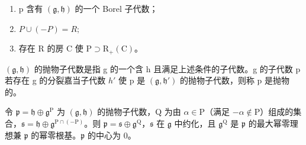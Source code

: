 \begin{enumerate}
\def\labelenumi{(\roman{enumi})}
\item
  p 含有 \((\mathfrak{g}, \mathfrak{h})\) 的一个 Borel 子代数；
\item
  \(P \cup (-P) = R;\)
\item
  存在 R 的房 C 使 \(\mathrm{P} \supset \mathrm{R}_{+}(\mathrm{C})\)。
\end{enumerate}

\((\mathfrak{g},\mathfrak{h})\) 的抛物子代数是指 g 的一个含 h 且满足上述条件的子代数。g 的子代数 p 若存在 g 的分裂嘉当子代数 \(h'\) 使 p 是 \((\mathfrak{g},\mathfrak{h}')\) 的抛物子代数，则称 p 是抛物的。

令 \(\mathfrak{p} = \mathfrak{h} \oplus \mathfrak{g}^{\mathrm{P}}\) 为 \((\mathfrak{g}, \mathfrak{h})\) 的抛物子代数，Q 为由 \(\alpha \in \mathrm{P}\)（满足 \(-\alpha \notin \mathrm{P}\)）组成的集合，\(\mathfrak{s} = \mathfrak{h} \oplus \mathfrak{g}^{\mathrm{P} \cap (-\mathrm{P})}\)。则 \(\mathfrak{p} = \mathfrak{s} \oplus \mathfrak{g}^{\mathrm{Q}}\)，\(\mathfrak{s}\) 在 \(\mathfrak{g}\) 中约化，且 \(\mathfrak{g}^{\mathrm{Q}}\) 是 \(\mathfrak{p}\) 的最大幂零理想兼 \(\mathfrak{p}\) 的幂零根基。\(\mathfrak{p}\) 的中心为 0。

